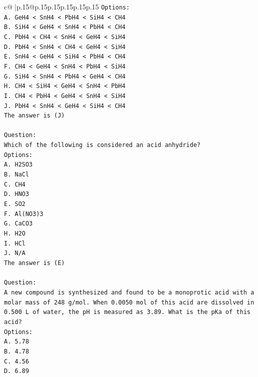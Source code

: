 \documentclass{article}
\begin{document}
{\begin{supertabular}{c@{$\;$}|p{.15\linewidth}@{}p{.15\linewidth}p{.15\linewidth}p{.15\linewidth}p{.15\linewidth}p{.15\linewidth}}
{{{\texttt{Options:} \\
\texttt{A. GeH4 < SnH4 < PbH4 < SiH4 < CH4} \\
\texttt{B. SiH4 < GeH4 < SnH4 < PbH4 < CH4} \\
\texttt{C. PbH4 < CH4 < SnH4 < GeH4 < SiH4} \\
\texttt{D. PbH4 < SnH4 < CH4 < GeH4 < SiH4} \\
\texttt{E. SnH4 < GeH4 < SiH4 < PbH4 < CH4} \\
\texttt{F. CH4 < GeH4 < SnH4 < PbH4 < SiH4} \\
\texttt{G. SiH4 < SnH4 < PbH4 < GeH4 < CH4} \\
\texttt{H. CH4 < SiH4 < GeH4 < SnH4 < PbH4} \\
\texttt{I. CH4 < PbH4 < GeH4 < SnH4 < SiH4} \\
\texttt{J. PbH4 < SnH4 < GeH4 < SiH4 < CH4} \\
\texttt{The answer is (J)} \\
\\ 
\texttt{Question:} \\
\texttt{Which of the following is considered an acid anhydride?} \\
\texttt{Options:} \\
\texttt{A. H2SO3} \\
\texttt{B. NaCl} \\
\texttt{C. CH4} \\
\texttt{D. HNO3} \\
\texttt{E. SO2} \\
\texttt{F. Al(NO3)3} \\
\texttt{G. CaCO3} \\
\texttt{H. H2O} \\
\texttt{I. HCl} \\
\texttt{J. N/A} \\
\texttt{The answer is (E)} \\
\\ 
\texttt{Question:} \\
\texttt{A new compound is synthesized and found to be a monoprotic acid with a molar mass of 248 g/mol. When 0.0050 mol of this acid are dissolved in 0.500 L of water, the pH is measured as 3.89. What is the pKa of this acid?} \\
\texttt{Options:} \\
\texttt{A. 5.78} \\
\texttt{B. 4.78} \\
\texttt{C. 4.56} \\
\texttt{D. 6.89} \\
}}}
\end{supertabular}}
\end{document}
